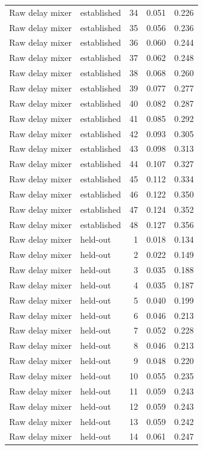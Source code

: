 \begin{tabular}{llrrr}
Raw delay mixer & established & 34 & 0.051 & 0.226 \\
Raw delay mixer & established & 35 & 0.056 & 0.236 \\
Raw delay mixer & established & 36 & 0.060 & 0.244 \\
Raw delay mixer & established & 37 & 0.062 & 0.248 \\
Raw delay mixer & established & 38 & 0.068 & 0.260 \\
Raw delay mixer & established & 39 & 0.077 & 0.277 \\
Raw delay mixer & established & 40 & 0.082 & 0.287 \\
Raw delay mixer & established & 41 & 0.085 & 0.292 \\
Raw delay mixer & established & 42 & 0.093 & 0.305 \\
Raw delay mixer & established & 43 & 0.098 & 0.313 \\
Raw delay mixer & established & 44 & 0.107 & 0.327 \\
Raw delay mixer & established & 45 & 0.112 & 0.334 \\
Raw delay mixer & established & 46 & 0.122 & 0.350 \\
Raw delay mixer & established & 47 & 0.124 & 0.352 \\
Raw delay mixer & established & 48 & 0.127 & 0.356 \\
Raw delay mixer & held-out & 1 & 0.018 & 0.134 \\
Raw delay mixer & held-out & 2 & 0.022 & 0.149 \\
Raw delay mixer & held-out & 3 & 0.035 & 0.188 \\
Raw delay mixer & held-out & 4 & 0.035 & 0.187 \\
Raw delay mixer & held-out & 5 & 0.040 & 0.199 \\
Raw delay mixer & held-out & 6 & 0.046 & 0.213 \\
Raw delay mixer & held-out & 7 & 0.052 & 0.228 \\
Raw delay mixer & held-out & 8 & 0.046 & 0.213 \\
Raw delay mixer & held-out & 9 & 0.048 & 0.220 \\
Raw delay mixer & held-out & 10 & 0.055 & 0.235 \\
Raw delay mixer & held-out & 11 & 0.059 & 0.243 \\
Raw delay mixer & held-out & 12 & 0.059 & 0.243 \\
Raw delay mixer & held-out & 13 & 0.059 & 0.242 \\
Raw delay mixer & held-out & 14 & 0.061 & 0.247 \\

\end{tabular}
